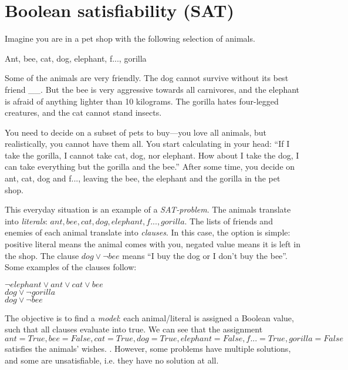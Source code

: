\section{Boolean satisfiability (SAT)}


Imagine you are in a pet shop with the following selection of animals.

{\center Ant, bee, cat, dog, elephant, f..., gorilla}

Some of the animals are very friendly. The dog cannot survive without its best friend __. But the bee is very aggressive towards all carnivores, and the elephant is afraid of anything lighter than 10 kilograms. The gorilla hates four-legged creatures, and the cat cannot stand insects. 

You need to decide on a subset of pets to buy---you love all animals, but realistically, you cannot have them all. You start calculating in your head: ``If I take the gorilla, I cannot take cat, dog, nor elephant. How about I take the dog, I can take everything but the gorilla and the bee.''
After some time, you decide on ant, cat, dog and f..., leaving the bee, the elephant and the gorilla in the pet shop.


This everyday situation is an example of a \emph{SAT-problem}.
The animals translate into \emph{literals}: ${ant, bee, cat, dog, elephant, f..., gorilla}$.
The lists of friends and enemies of each animal translate into \emph{clauses}.
In this case, the option is simple: positive literal means the animal comes with you, negated value means it is left in the shop. The clause $dog \vee \neg{}bee$ means ``I buy the dog or I don't buy the bee''. 
Some examples of the clauses follow:

\begin{center}
$\neg{}elephant \vee ant \vee cat \vee bee$ \\
$dog \vee \neg{}gorilla$ \\
$dog \vee \neg{}bee$ \\
\end{center}

The objective is to find a \emph{model}: each animal/literal is assigned a Boolean value, such that all clauses evaluate into true. We can see that the assignment ${ant=True, bee=False, cat=True, dog=True, elephant=False, f...=True, gorilla=False}$ satisfies the animals' wishes.
. However, some problems have multiple solutions, and some are unsatisfiable, i.e. they have no solution at all.

